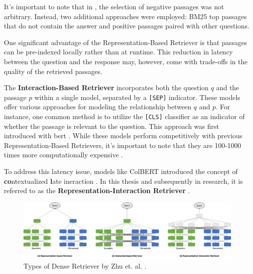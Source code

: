 It's important to note that in \cite{karpukhin_dense_2020}, the selection of negative passages was not arbitrary. Instead, two additional approaches were employed: BM25 top passages that do not contain the answer and positive passages paired with other questions.

One significant advantage of the Representation-Based Retriever is that passages can be pre-indexed locally rather than at runtime. This reduction in latency between the question and the response may, however, come with trade-offs in the quality of the retrieved passages.

The \textbf{Interaction-Based Retriever} incorporates both the question $q$ and the passage $p$ within a single model, separated by a \verb|[SEP]| indicator. These models offer various approaches for modeling the relationship between $q$ and $p$. For instance, one common method is to utilize the \verb|[CLS]| classifier as an indicator of whether the passage is relevant to the question. This approach was first introduced with \gls{bert} \cite{devlin_bert_2019}. While these models perform competitively with previous Representation-Based Retrievers, it's important to note that they are 100-1000 times more computationally expensive \cite{khattab_colbert_2020}.

To address this latency issue, models like ColBERT introduced the concept of \textbf{co}ntextualized \textbf{l}ate ineraction \cite{khattab_colbert_2020}. In this thesis and subsequently in research, it is referred to as the \textbf{Representation-Interaction Retriever} \cite{zhu_retrieving_2021}.


\begin{figure}
    \centering
    \includegraphics[width=\textwidth]{Grafiken/Types_of_Retriever.png}
    \caption{Types of Dense Retriever by Zhu et. al. \cite{zhu_retrieving_2021}.}
    \label{fig:types_of_retriever}
\end{figure}

